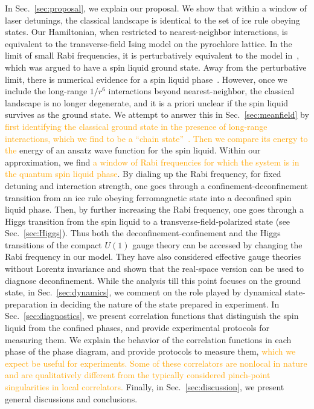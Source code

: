 \documentclass[twocolumn,superscriptaddress,amsmath,amssymb,aps,prx,nofootinbib]{revtex4-2}
\newcommand{\addtext}[1]{\textcolor{orange}{#1}}
\begin{document}
In Sec.~\ref{sec:proposal}, we explain our proposal. We show that within a window of laser detunings, the classical landscape is identical to the set of ice rule obeying states.
Our Hamiltonian, when restricted to nearest-neighbor interactions, is equivalent to the transverse-field Ising model on the pyrochlore lattice. In the limit of small Rabi frequencies, it is perturbatively equivalent to the model in~\cite{hermele2004}, which was argued to have a spin liquid ground state. 
Away from the perturbative limit, there is numerical evidence for a spin liquid phase~\cite{emonts2018monte}. 
However, once we include the long-range $1/r^6$ interactions beyond nearest-neighbor, the classical landscape is no longer degenerate, and it is a priori unclear if the spin liquid survives as the ground state. 
We attempt to answer this in Sec.~\ref{sec:meanfield} by \addtext{first identifying  the classical ground state in the presence of long-range interactions, which we find to be a ``chain state''~\cite{mcclarty2015chain}. Then we compare its energy to the} energy of an ansatz wave function for the spin liquid. 
Within our approximation, we find \addtext{a window of Rabi frequencies for which the system is in the quantum spin liquid phase}. By dialing up the Rabi frequency, for fixed detuning and interaction strength, one goes through a confinement-deconfinement transition from an ice rule obeying ferromagnetic state into a deconfined spin liquid phase. Then, by further increasing the Rabi frequency, one goes through a Higgs transition from the spin liquid to a transverse-field-polarized state (see Sec.~\ref{sec:Higgs}). 
Thus both the deconfinement-confinement and the Higgs transitions of the compact $U(1)$ gauge theory can be accessed by changing the Rabi frequency in our model.
They have also considered effective gauge theories without Lorentz invariance and shown that the real-space version can be used to diagnose deconfinement.
While the analysis till this point focuses on the ground state, in Sec.~\ref{sec:dynamics}, we comment on the role played by dynamical state-preparation in deciding the nature of the state prepared in experiment. 
In Sec.~\ref{sec:diagnostics}, we present correlation functions that distinguish the spin liquid from the confined phases, and provide experimental protocols for measuring them.
We explain the behavior of the correlation functions in each phase of the phase diagram, and provide protocols to measure them, \addtext{which we expect be useful for experiments. Some of these correlators are nonlocal in nature and are qualitatively different from the typically considered pinch-point singularities in local correlators.}
Finally, in Sec.~\ref{sec:discussion}, we present general discussions and conclusions.
\end{document}
